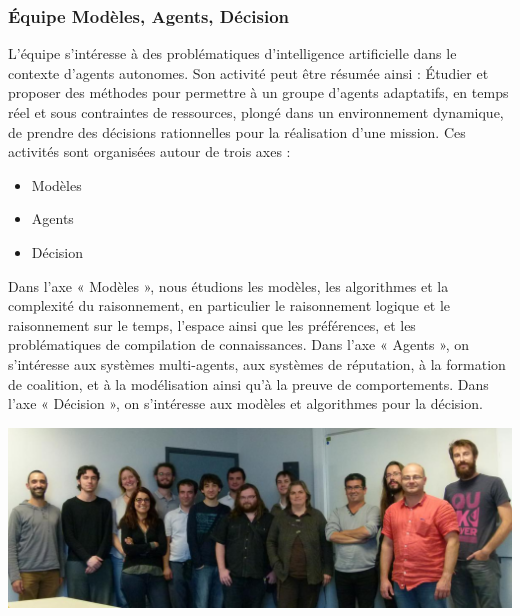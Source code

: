\documentclass[a4paper,12pt]{article} %
\begin{document}
\subsubsection{Équipe Modèles, Agents, Décision}
 L'équipe s'intéresse à des problématiques d'intelligence artificielle dans le contexte d'agents autonomes. Son activité peut être résumée ainsi :
\newline\newline
Étudier et proposer des méthodes pour permettre à un groupe d'agents adaptatifs, en temps réel et sous contraintes de ressources, plongé dans un environnement dynamique, de prendre des décisions rationnelles pour la réalisation d'une mission.
\newline\newline
Ces activités sont organisées autour de trois axes :
\newline
\begin{itemize}
\item Modèles
\item Agents
\item Décision
\newline
\end{itemize} 
Dans l'axe « Modèles », nous étudions les modèles, les algorithmes et la complexité du raisonnement, en particulier le raisonnement logique et le raisonnement sur le temps, l'espace ainsi que les préférences, et les problématiques de compilation de connaissances. Dans l'axe « Agents », on s'intéresse aux systèmes multi-agents, aux systèmes de réputation, à la formation de coalition, et à la modélisation ainsi qu'à la preuve de comportements. Dans l'axe « Décision », on s'intéresse aux modèles et algorithmes pour la décision.
\newline\newline
\begin{center} \includegraphics[scale=0.4]{mad.jpg} \end{center}
\newpage
\end{document}
